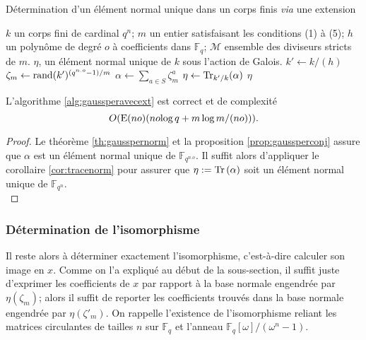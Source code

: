 \documentclass[a4paper]{article} %
\numberwithin{section}{part}
\numberwithin{equation}{section}
\newcommand\GF[1]{\mathbb{F}_{#1}}
\newcommand\Tr[1]{\textup{Tr}\left(#1\right)}
\newcommand\E[1]{\textup{E}(#1)}
\begin{document}
\begin{algorithm}
\caption{Détermination d'un élément normal unique dans un corps finis
\textit{via} une extension}
\label{alg:gaussperavecext}
\begin{algorithmic}[1]
\REQUIRE $k$ un corps fini de cardinal $q^n$; $m$ un entier satisfaisant les 
conditions (1) à (5); $h$ un polynôme de degré $o$ à coefficients dans $\GF{q}$;
$\mathcal{M}$ ensemble des diviseurs stricts de
$m$.
\ENSURE $\eta$, un élément normal unique de $k$ sous l'action de Galois.
\bigskip
\STATE $k' \leftarrow k/(h)$
\REPEAT
    \STATE $\zeta_m \leftarrow \textup{rand}(k')^{(q^{n.o} - 1)/m}$
\STATE $\alpha \leftarrow \sum_{a\in S}{\zeta_m^a}$
\STATE $\eta \leftarrow \textup{Tr}_{k'/k}(\alpha)$
\RETURN $\eta$
\end{algorithmic}
\end{algorithm}
\begin{prop} 
\label{prop:algavecext}
L'algorithme \ref{alg:gaussperavecext} est correct et de complexité
\begin{equation}
O(\E{no}(no\textup{log\,}q + m\,\textup{log\,}m/(no))).
\end{equation}
\end{prop}
\begin{proof}
Le théorème \ref{th:gausspernorm} et la proposition \ref{prop:gaussperconj}
assure que $\alpha$ est un élément normal unique de $\GF{q^{n.o}}$. Il suffit 
alors d'appliquer le corollaire \ref{cor:tracenorm} pour assurer que $\eta :=
\Tr{\alpha}$ soit un élément normal unique de $\GF{q^n}$.\\
\end{proof}

\subsubsection*{Détermination de l'isomorphisme}
Il reste alors à déterminer exactement l'isomorphisme, c'est-à-dire calculer son
image en $x$. Comme on l'a expliqué au début de la sous-section, il suffit juste
d'exprimer les coefficients de $x$ par rapport à la base normale engendrée par
$\eta(\zeta_m)$; alors il suffit de reporter les coefficients 
trouvés dans la base normale engendrée par $\eta(\zeta'_m)$. On rappelle
l'existence de l'isomorphisme reliant les matrices circulantes de tailles $n$ 
sur $\GF{q}$ et l'anneau $\GF{q}[\omega]/(\omega^n - 1)$.
\end{document}
